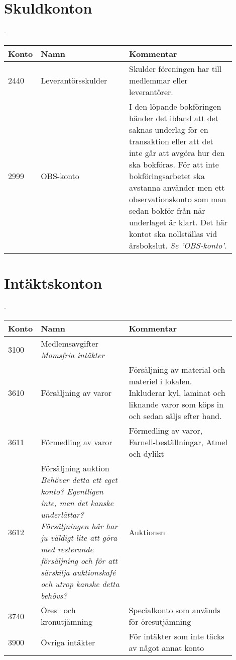 \section{Skuldkonton}
\begin{addmargin*}[0em]{-\overhang}
	\begin{longtable}[l]{l p{0.4\linewidth} p{0.5\linewidth}}
		Konto	&	Namn								& Kommentar \\ \toprule \endhead
		2440	&	Leverantörsskulder					& Skulder föreningen har till medlemmar eller leverantörer. \\
		2999	&	OBS-konto							& I den löpande bokföringen händer det ibland att det saknas underlag för en transaktion eller att det inte går att avgöra hur den ska bokföras. För att inte bokföringsarbetet ska avstanna använder men ett observationskonto som man sedan bokför från när underlaget är klart. Det här kontot ska nollställas vid årsbokslut. \emph{Se 'OBS-konto'}.
	\end{longtable}
\end{addmargin*}


\section{Intäktskonton}
\begin{addmargin*}[0em]{-\overhang}
	\begin{longtable}[l]{l p{0.4\linewidth} p{0.5\linewidth}}
		Konto	&	Namn								& Kommentar \\ \toprule \endhead
		3100	&	Medlemsavgifter \newline \emph{Momsfria intäkter} \\
		3610	&	Försäljning av varor				& Försäljning av material och materiel i lokalen. Inkluderar kyl, laminat och liknande varor som köps in och sedan säljs efter hand.\\
		3611	&	Förmedling av varor					& Förmedling av varor, Farnell-beställningar, Atmel och dylikt\\
		3612	&	Försäljning auktion \emph{Behöver detta ett eget konto? Egentligen inte, men det kanske underlättar? Försäljningen här har ju väldigt lite att göra med resterande försäljning och för att särskilja auktionskafé och utrop kanske detta behövs?} & Auktionen\\
		3740	&	Öres-- och kronutjämning			& Specialkonto som används för öresutjämning\\
		3900	&	Övriga intäkter						& För intäkter som inte täcks av något annat konto
	\end{longtable}
\end{addmargin*}

